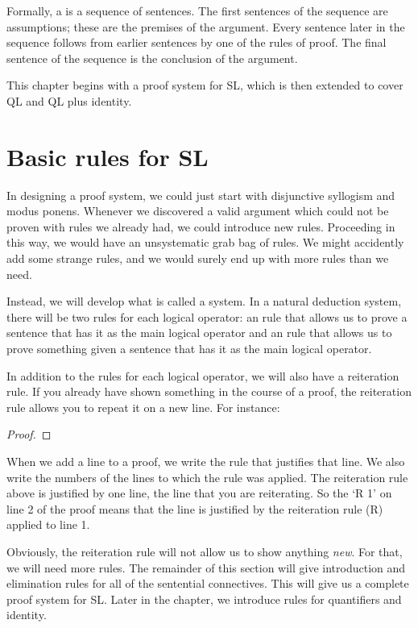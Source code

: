 Formally, a  is a sequence of sentences. The first sentences of the sequence are assumptions; these are the premises of the argument. Every sentence later in the sequence follows from earlier sentences by one of the rules of proof. The final sentence of the sequence is the conclusion of the argument.

This chapter begins with a proof system for SL, which is then extended to cover QL and QL plus identity.


\section{Basic rules for SL}

In designing a proof system, we could just start with disjunctive syllogism and modus ponens. Whenever we discovered a valid argument which could not be proven with rules we already had, we could introduce new rules. Proceeding in this way, we would have an unsystematic grab bag of rules. We might accidently add some strange rules, and we would surely end up with more rules than we need.

Instead, we will develop what is called a  system. In a natural deduction system, there will be two rules for each logical operator: an  rule that allows us to prove a sentence that has it as the main logical operator and an  rule that allows us to prove something given a sentence that has it as the main logical operator.

In addition to the rules for each logical operator, we will also have a reiteration rule. If you already have shown something in the course of a proof, the reiteration rule allows you to repeat it on a new line. For instance:

\begin{proof}
	 
\end{proof}

When we add a line to a proof, we write the rule that justifies that line. We also write the numbers of the lines to which the rule was applied. The reiteration rule above is justified by one line, the line that you are reiterating. So the `R 1' on line 2 of the proof means that the line is justified by the reiteration rule (R) applied to line 1.



Obviously, the reiteration rule will not allow us to show anything \emph{new}. For that, we will need more rules. The remainder of this section will give introduction and elimination rules for all of the sentential connectives. This will give us a complete proof system for SL. Later in the chapter, we introduce rules for quantifiers and identity.

